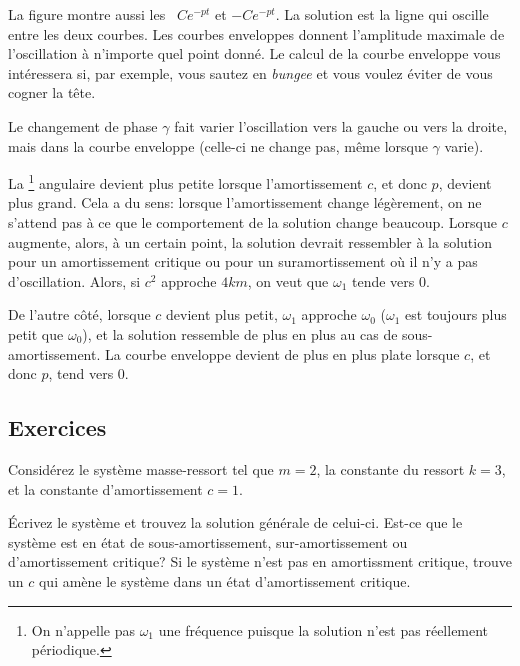 
La figure montre aussi les~\emph{} $C e^{-pt}$ et $-C e^{-pt}$.  
La solution est la ligne qui oscille entre les deux courbes. 
Les courbes enveloppes donnent l'amplitude maximale de l'oscillation à n'importe quel point donné. 
Le calcul de la courbe enveloppe vous intéressera si, par exemple, vous sautez en \emph{bungee} et vous voulez éviter de vous cogner la tête. 

Le changement de phase $\gamma$ fait varier l'oscillation vers la gauche ou vers la droite, 
mais dans la courbe enveloppe (celle-ci ne change pas, même lorsque $\gamma$ varie).


La \emph{}\footnote{On n'appelle pas $\omega_1$ une fréquence puisque la solution n'est pas réellement périodique.} angulaire devient plus petite lorsque l'amortissement 
$c$, et donc $p$, devient plus grand. Cela a du sens: lorsque l'amortissement change légèrement, on ne s'attend pas à ce que le comportement de la solution change beaucoup. Lorsque $c$ augmente,  alors, à un certain point, la solution devrait ressembler à la solution pour un amortissement critique ou pour un suramortissement où il n'y a pas d'oscillation. Alors, si $c^2$ approche $4km$, on veut que $\omega_1$ tende vers 0.

De l'autre côté, lorsque $c$ devient plus petit, $\omega_1$ approche $\omega_0$
($\omega_1$ est toujours plus petit que $\omega_0$), et la solution ressemble de plus en plus au cas de sous-amortissement. La courbe enveloppe devient de plus en plus plate lorsque $c$, et donc $p$, tend vers 0.

\subsection{Exercices}

\begin{samepage}
\begin{exercise} \label{mv:ex1}
	Considérez le système masse-ressort  tel que $m=2$, la constante du ressort $k=3$, et la constante d'amortissement $c=1$.
	\begin{tasks}
		\task Écrivez le système et trouvez la solution générale de celui-ci.
		\task Est-ce que le système est en état de  sous-amortissement, sur-amortissement ou d'amortissement critique? 
		\task Si le système n'est pas en amortissment critique, trouve un $c$ qui amène le système dans un état 	
				d'amortissement critique. 
	\end{tasks}
\end{exercise}
\end{samepage}

